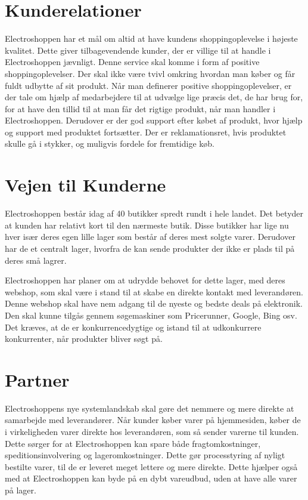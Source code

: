 \section{Kunderelationer}
Electroshoppen har et mål om altid at have kundens shoppingoplevelse i højeste kvalitet. Dette giver tilbagevendende kunder, der er villige til at handle i Electroshoppen jævnligt. Denne service skal komme i form af positive shoppingoplevelser. Der skal ikke være tvivl omkring hvordan man køber og får fuldt udbytte af sit produkt. Når man definerer positive shoppingoplevelser, er der tale om hjælp af medarbejdere til at udvælge lige præcis det, de har brug for, for at have den tillid til at man får det rigtige produkt, når man handler i Electroshoppen. Derudover er der god support efter købet af produkt, hvor hjælp og support med produktet fortsætter. Der er reklamationsret, hvis produktet skulle gå i stykker, og muligvis fordele for fremtidige køb.

\section{Vejen til Kunderne}
Electroshoppen består idag af 40 butikker spredt rundt i hele landet. Det betyder at kunden har relativt kort til den nærmeste butik. Disse butikker har lige nu hver især deres egen lille lager som består af deres mest solgte varer. Derudover har de et centralt lager, hvorfra de kan sende produkter der ikke er plads til på deres små lagrer. 

Electroshoppen har planer om at udrydde behovet for dette lager, med deres webshop, som skal være i stand til at skabe en direkte kontakt med leverandøren. Denne webshop skal have nem adgang til de nyeste og bedste deals på elektronik. Den skal kunne tilgås gennem søgemaskiner som Pricerunner, Google, Bing osv. Det kræves, at de er konkurrencedygtige og istand til at udkonkurrere konkurrenter, når produkter bliver søgt på.

\section{Partner}
Electroshoppens nye systemlandskab skal gøre det nemmere og mere direkte at samarbejde med leverandører. Når kunder køber varer på hjemmesiden, køber de i virkeligheden varer direkte hos leverandøren, som så sender varerne til kunden. Dette sørger for at Electroshoppen kan spare både fragtomkostninger, speditionsinvolvering og lageromkostninger. Dette gør processtyring af nyligt bestilte varer, til de er leveret meget lettere og mere direkte. Dette hjælper også med at Electroshoppen kan byde på en dybt vareudbud, uden at have alle varer på lager.

